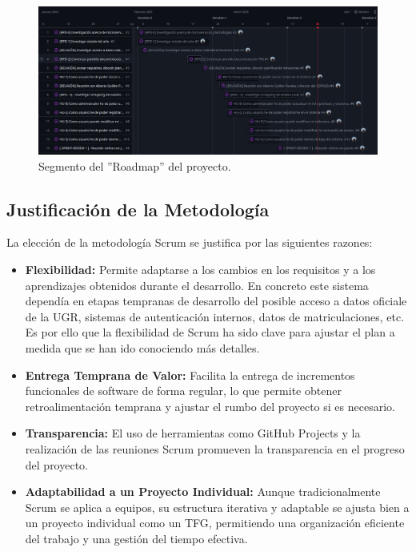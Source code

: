 \begin{figure}[h!] 
    \centering 
    \includegraphics[width=1\textwidth]{figures/04_roadmap.png}
    \caption{Segmento del ''Roadmap'' del proyecto.} %
    \label{roadmap_github} %
\end{figure}

\subsection{Justificación de la Metodología}

La elección de la metodología Scrum se justifica por las siguientes razones:

\begin{itemize}
    \item \textbf{Flexibilidad:} Permite adaptarse a los cambios en los requisitos y a los aprendizajes obtenidos durante el desarrollo. En concreto este sistema dependía en etapas tempranas de desarrollo del posible acceso a datos oficiale de la UGR, sistemas de autenticación internos, datos de matriculaciones, etc. Es por ello que la flexibilidad de Scrum ha sido clave para ajustar el plan a medida que se han ido conociendo más detalles.
    \item \textbf{Entrega Temprana de Valor:} Facilita la entrega de incrementos funcionales de software de forma regular, lo que permite obtener retroalimentación temprana y ajustar el rumbo del proyecto si es necesario.
    \item \textbf{Transparencia:} El uso de herramientas como GitHub Projects y la realización de las reuniones Scrum promueven la transparencia en el progreso del proyecto.
    \item \textbf{Adaptabilidad a un Proyecto Individual:} Aunque tradicionalmente Scrum se aplica a equipos, su estructura iterativa y adaptable se ajusta bien a un proyecto individual como un TFG, permitiendo una organización eficiente del trabajo y una gestión del tiempo efectiva.
\end{itemize}

